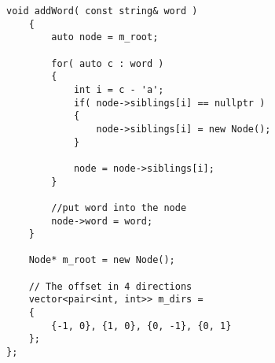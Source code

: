 \begin{lstlisting}[style=customc, caption={DFS And Trie}]
    void addWord( const string& word )
    {
        auto node = m_root;

        for( auto c : word )
        {
            int i = c - 'a';
            if( node->siblings[i] == nullptr )
            {
                node->siblings[i] = new Node();
            }

            node = node->siblings[i];
        }

		//put word into the node
        node->word = word;
    }

    Node* m_root = new Node();
	
	// The offset in 4 directions
    vector<pair<int, int>> m_dirs =
    {
        {-1, 0}, {1, 0}, {0, -1}, {0, 1}
    };
};
\end{lstlisting}